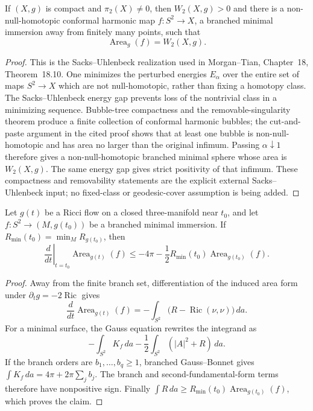 \begin{theorem}
\label{thm:two-sphere-width-realization}
\notready
If $(X,g)$ is compact and $\pi_2(X)\ne0$, then $W_2(X,g)>0$ and there is a
non-null-homotopic conformal harmonic map $f\colon S^2\to X$, a branched
minimal immersion away from finitely many points, such that
\[
 \operatorname{Area}_g(f)=W_2(X,g).
\]
\end{theorem}

\begin{proof}
This is the Sacks--Uhlenbeck realization used in Morgan--Tian,
Chapter~18, Theorem~18.10.  One minimizes the perturbed energies
$E_\alpha$ over the entire set of maps $S^2\to X$ which are not
null-homotopic, rather than fixing a homotopy class.  The Sacks--Uhlenbeck
energy gap prevents loss of the nontrivial class in a minimizing sequence.
Bubble-tree compactness and the removable-singularity theorem produce a
finite collection of conformal harmonic bubbles; the cut-and-paste argument
in the cited proof shows that at least one bubble is non-null-homotopic and
has area no larger than the original infimum.  Passing \(\alpha\downarrow1\)
therefore gives a non-null-homotopic branched minimal sphere whose area is
$W_2(X,g)$.  The same energy gap gives strict positivity of that infimum.
These compactness and removability statements are the explicit external
Sacks--Uhlenbeck input; no fixed-class or geodesic-cover assumption is being
added.
\end{proof}


\begin{lemma}
\label{lem:minimal-two-sphere-area-variation}
\notready
Let $g(t)$ be a Ricci flow on a closed three-manifold near $t_0$, and let
$f\colon S^2\to(M,g(t_0))$ be a branched minimal immersion.  If
$R_{\min}(t_0)=\min_M R_{g(t_0)}$, then
\[
 \left.\frac d{dt}\right|_{t=t_0}\operatorname{Area}_{g(t)}(f)
 \le -4\pi-\frac12R_{\min}(t_0)\operatorname{Area}_{g(t_0)}(f).
\]
\end{lemma}

\begin{proof}
Away from the finite branch set, differentiation of the induced area form
under $\partial_tg=-2\operatorname{Ric}$ gives
\[
 \frac d{dt}\operatorname{Area}_{g(t)}(f)
 =-\int_{S^2}\bigl(R-\operatorname{Ric}(\nu,\nu)\bigr)\,da.
\]
For a minimal surface, the Gauss equation rewrites the integrand as
\[
 -\int_{S^2}K_f\,da-
 \frac12\int_{S^2}(|A|^2+R)\,da.
\]
If the branch orders are $b_1,\ldots,b_q\ge1$, branched Gauss--Bonnet gives
$\int K_f\,da=4\pi+2\pi\sum_jb_j$.  The branch and second-fundamental-form
terms therefore have nonpositive sign.  Finally
$\int R\,da\ge R_{\min}(t_0)\operatorname{Area}_{g(t_0)}(f)$, which proves the claim.
\end{proof}

